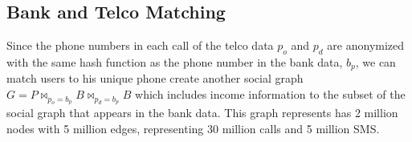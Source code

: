 \subsection{Bank and Telco Matching}

Since the phone numbers in each call of the telco data $ p_o $ and $ p_d $ are anonymized with the same hash function as the phone number in the bank data, $ b_p $, we can match users to his unique phone create another social graph $ G = P \bowtie_{p_o = b_p} B \bowtie_{p_d = b_p} B $ which includes income information to the subset of the social graph that appears in the bank data. This graph represents has 2 million nodes with 5 million edges, representing 30 million calls and 5 million SMS.

